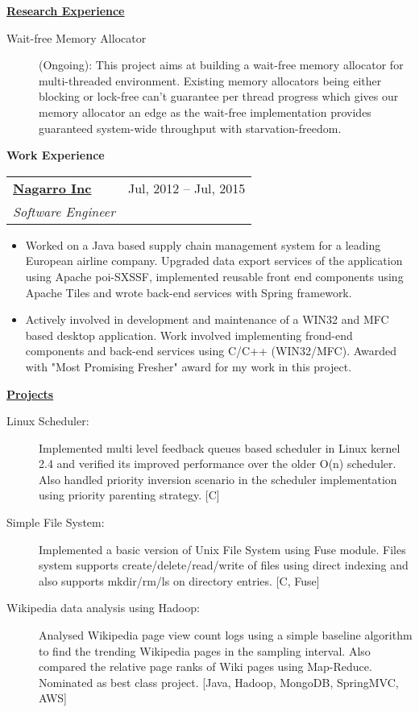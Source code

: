 \documentclass[letterpaper,11pt]{article}
\makeatletter
\newcommand{\resitem}[1]{\item #1 \vspace{2pt}}
\newcommand{\resheading}[1]{{\large \colorbox{mygrey}{\begin{minipage}{\textwidth}{\textbf{#1 \vphantom{p\^{E}}}}\end{minipage}}}\vspace{6pt}}
\newcommand{\ressubheading}[4]{
\begin{tabular*}{7in}{l@{\extracolsep{\fill}}r}
		\textbf{#1} & #2 \\
		\textit{#3} & \textit{#4} \\
\end{tabular*}\vspace{-3pt}}
\makeatother
\begin{document}
\resheading{\href{https://github.com/ashish-17/}{Research Experience}}
\begin{description}
\item[Wait-free Memory Allocator]{\footnotesize(Ongoing): This project aims at building a wait-free memory allocator for multi-threaded environment. Existing memory allocators being either blocking or lock-free can't guarantee per thread progress which gives our memory allocator an edge as the wait-free implementation provides guaranteed system-wide throughput with starvation-freedom.}

\end{description}
\resheading{Work Experience}
			\ressubheading{\href{http://www.nagarro.com/}{Nagarro Inc}}{Jul, 2012 -- Jul, 2015}
				{Software Engineer}{}
				{ \footnotesize
				\begin{itemize}
					\resitem{Worked on a Java based supply chain management system for a leading European airline company. Upgraded data export services  of the application using Apache poi-SXSSF, implemented reusable front end components using Apache Tiles and wrote back-end services with Spring framework.}
					\resitem{Actively involved in development and maintenance of a WIN32 and MFC based desktop application. Work involved implementing frond-end components and back-end services using C/C++ (WIN32/MFC). Awarded with "Most Promising Fresher" award for my work in this project.}
							\end{itemize}
				}			


\resheading{\href{http://www.ashish-jindal.com/}{Projects}}

\begin{description}
\item[Linux Scheduler:] { \footnotesize Implemented multi level feedback queues based scheduler in Linux kernel 2.4 and verified its improved performance over the older O(n) scheduler. Also handled priority inversion scenario in the scheduler implementation using priority parenting strategy. [C]}

\item[Simple File System:] { \footnotesize Implemented a basic version of Unix File System using Fuse module. Files system supports create/delete/read/write of files using direct indexing and also supports mkdir/rm/ls on directory entries. [C, Fuse]}

\item[Wikipedia data analysis using Hadoop:] { \footnotesize Analysed Wikipedia page view count logs using a simple baseline algorithm to find the trending Wikipedia pages in the sampling interval. Also compared the relative page ranks of Wiki pages using Map-Reduce. Nominated as best class project. [Java, Hadoop, MongoDB, SpringMVC, AWS]}

\end{description}
\end{document}
